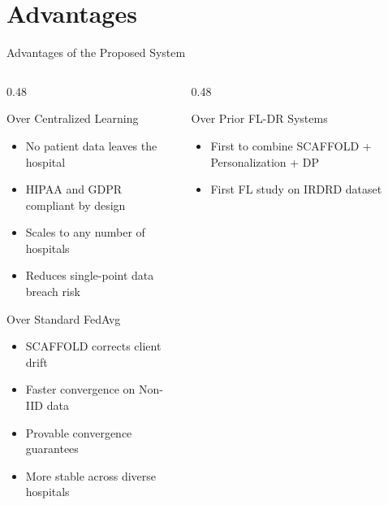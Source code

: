 \documentclass[aspectratio=169, 11pt]{beamer}
\begin{document}
\section{Advantages}

\begin{frame}{Advantages of the Proposed System}
  \begin{columns}[T]
    \begin{column}{0.48\textwidth}
      \begin{exampleblock}{Over Centralized Learning}\small
        \begin{itemize}
          \item No patient data leaves the hospital
          \item HIPAA and GDPR compliant by design
          \item Scales to any number of hospitals
          \item Reduces single-point data breach risk
        \end{itemize}
      \end{exampleblock}
      \vspace{4pt}
      \begin{exampleblock}{Over Standard FedAvg}\small
        \begin{itemize}
          \item SCAFFOLD corrects client drift
          \item Faster convergence on Non-IID data
          \item Provable convergence guarantees
          \item More stable across diverse hospitals
        \end{itemize}
      \end{exampleblock}
    \end{column}
    \begin{column}{0.48\textwidth}
      \begin{exampleblock}{Over Prior FL-DR Systems}\small
        \begin{itemize}
          \item First to combine SCAFFOLD + Personalization + DP
          \item First FL study on IRDRD dataset

\end{itemize}
\end{exampleblock}
\end{column}
\end{columns}
\end{frame}
\end{document}
